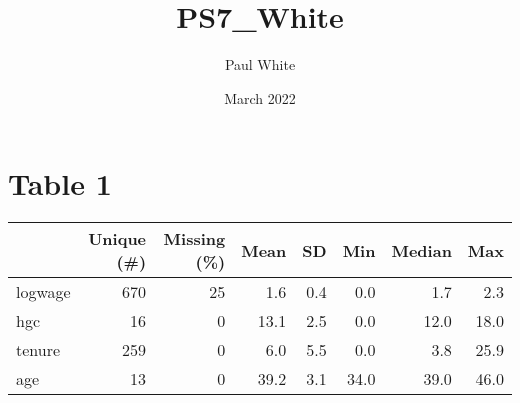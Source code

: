 \documentclass{article}
\title{PS7_White}
\author{Paul White}
\date{March 2022}
\begin{document}
\maketitle

\section{Table 1}

\begin{table}
\centering
\begin{tabular}[t]{lrrrrrrr}
\toprule
  & Unique (\#) & Missing (\%) & Mean & SD & Min & Median & Max\\
\midrule
logwage & 670 & 25 & \num{1.6} & \num{0.4} & \num{0.0} & \num{1.7} & \num{2.3}\\
hgc & 16 & 0 & \num{13.1} & \num{2.5} & \num{0.0} & \num{12.0} & \num{18.0}\\
tenure & 259 & 0 & \num{6.0} & \num{5.5} & \num{0.0} & \num{3.8} & \num{25.9}\\
age & 13 & 0 & \num{39.2} & \num{3.1} & \num{34.0} & \num{39.0} & \num{46.0}\\
\bottomrule
\end{tabular}
\end{table}
\end{document}
